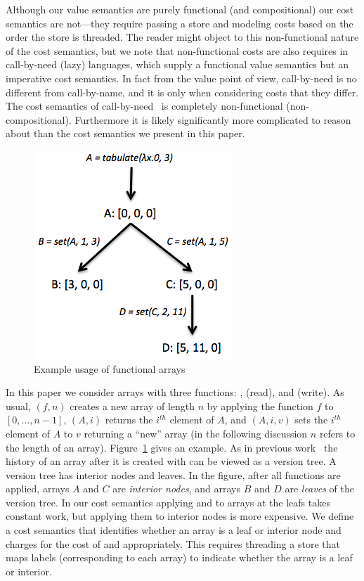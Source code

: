 Although our value semantics are purely functional (and compositional)
our cost semantics are not---they require passing a store and modeling
costs based on the order the store is threaded.  The reader might
object to this non-functional nature of the cost semantics, but we
note that non-functional costs are also requires in call-by-need
(lazy) languages, which supply a functional value semantics but an
imperative cost semantics.  In fact from the value point of view,
call-by-need is no different from call-by-name, and it is only when
considering costs that they differ.  The cost semantics of
call-by-need~\cite{AMOFW95} is completely non-functional
(non-compositional).  Furthermore it is likely significantly more
complicated to reason about than the cost semantics we present in this
paper.

\begin{figure}[!ht]
\centering 
\includegraphics[scale=0.45]{leaf_interior_intro}
\nocaptionrule \caption{Example usage of functional arrays}
\label{fig:leaf_interior_intro}
\end{figure}

In this paper we consider arrays with three functions: \tabulate{},
\get{} (read), and \set{} (write).  As usual, \tabulate{}$(f,n)$
creates a new array of length $n$ by applying the function $f$ to
$[0, \ldots, n-1]$, \get$(A,i)$ returns the $i^{th}$ element of $A$, and
\set$(A,i,v)$ sets the $i^{th}$ element of $A$ to $v$ returning a
``new'' array (in the following discussion $n$ refers to the length of
an array).  Figure~\ref{fig:leaf_interior_intro} gives an example.  As
in previous work~\cite{AHN88} the history of an array after it is
created with \tabulate{} can be viewed as a version tree.  A version
tree has interior nodes and leaves.  In the figure, after all
functions are applied, arrays $A$ and $C$ are \emph{interior nodes},
and arrays $B$ and $D$ are \emph{leaves} of the version tree.  In our
cost semantics applying \get{} and \set{} to arrays at the leafs takes
constant work, but applying them to interior nodes is more expensive.
We define a cost semantics that identifies whether an array is a leaf
or interior node and charges for the cost of \get{} and \set{}
appropriately.  This requires threading a store that maps labels
(corresponding to each array) to indicate whether the array is a leaf
or interior.

